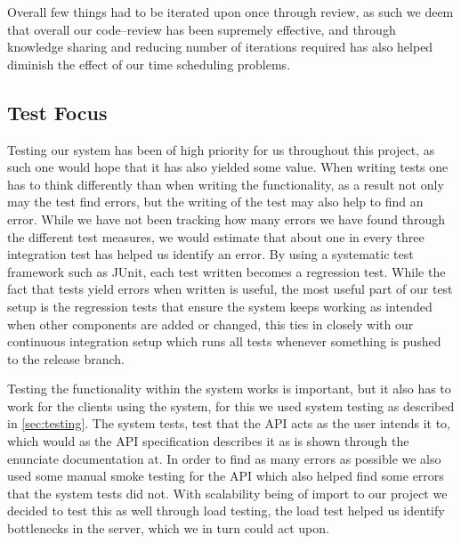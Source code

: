 Overall few things had to be iterated upon once through review, as such we deem that overall our code--review has been supremely effective, and through knowledge sharing and reducing number of iterations required has also helped diminish the effect of our time scheduling problems.
\subsection{Test Focus}
Testing our system has been of high priority for us throughout this project, as such one would hope that it has also yielded some value.
When writing tests one has to think differently than when writing the functionality, as a result not only may the test find errors, but the writing of the test may also help to find an error.
While we have not been tracking how many errors we have found through the different test measures, we would estimate that about one in every three integration test has helped us identify an error.
By using a systematic test framework such as JUnit, each test written becomes a regression test.
While the fact that tests yield errors when written is useful, the most useful part of our test setup is the regression tests that ensure the system keeps working as intended when other components are added or changed, this ties in closely with our continuous integration setup which runs all tests whenever something is pushed to the release branch.

Testing the functionality within the system works is important, but it also has to work for the clients using the system, for this we used system testing as described in \cref{sec:testing}.
The system tests, test that the API acts as the user intends it to, which would as the API specification describes it as is shown through the enunciate documentation at.
In order to find as many errors as possible we also used some manual smoke testing for the API which also helped find some errors that the system tests did not.
With scalability being of import to our project we decided to test this as well through load testing, the load test helped us identify bottlenecks in the server, which we in turn could act upon.

